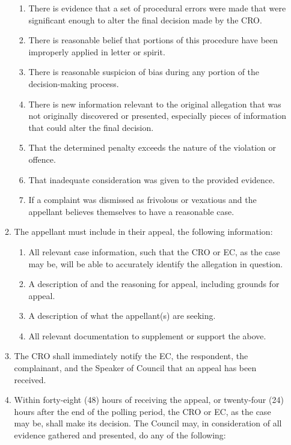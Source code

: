 \begin{enumerate}
\begin{enumerate}
				\begin{enumerate}
					\item There is evidence that a set of procedural errors were made that were significant enough to alter the final decision made by the CRO.
					\item There is reasonable belief that portions of this procedure have been improperly applied in letter or spirit.
					\item There is reasonable suspicion of bias during any portion of the decision-making process.
					\item There is new information relevant to the original allegation that was not originally discovered or presented, especially pieces of information that could alter the final decision.
					\item That the determined penalty exceeds the nature of the violation or offence.
					\item That inadequate consideration was given to the provided evidence.
					\item If a complaint was dismissed as frivolous or vexatious and the appellant believes themselves to have a reasonable case.
				\end{enumerate}
			\item The appellant must include in their appeal, the following information:
				\begin{enumerate}
					\item All relevant case information, such that the CRO or EC, as the case may be, will be able to accurately identify the allegation in question.
					\item A description of and the reasoning for appeal, including grounds for appeal.
					\item A description of what the appellant(s) are seeking.
					\item All relevant documentation to supplement or support the above.
				\end{enumerate}
			\item The CRO shall immediately notify the EC, the respondent, the complainant, and the Speaker of Council that an appeal has been received.
			\item Within forty-eight (48) hours of receiving the appeal, or twenty-four (24) hours after the end of the polling period, the CRO or EC, as the case may be, shall make its decision. The Council may, in consideration of all evidence gathered and presented, do any of the following:
				\begin{enumerate}

\end{enumerate}
\end{enumerate}
\end{enumerate}
